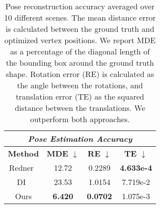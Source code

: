 \begin{table}
	\begin{center}
		\begin{tabular}{|c|c|c|c|}
			\hline
			\multicolumn{4}{|c|}{\textit{Pose Estimation Accuracy}} \\
			\hline
			\textbf{Method}                                             & \textbf{MDE}  $\downarrow$        & \textbf{RE} $\downarrow$ 		  & \textbf{TE} $\downarrow$    \\
			\hline
			Redner~\cite{li2018differentiable}							& 12.72		                            & 0.2289           	   	           & \textbf{4.633e-4}     \\
			DI~\cite{ravi2020pytorch3d} 							    & 23.53	                                &  1.0154      		                & 7.719e-2     \\
			\hline
			Ours    									   	            & \textbf{6.420}	                        & \textbf{0.0702}   	            & 1.075e-3     \\
			\hline
		\end{tabular}
	\end{center}
	\caption
	{
		Pose reconstruction accuracy averaged over 10 different scenes.
		The mean distance error is calculated between the ground truth and  optimized vertex positions. 
		We report MDE as a percentage of the diagonal length of the bounding box around the ground truth shape.
		Rotation error (RE) is calculated as the angle between the rotations, and translation error (TE) as the squared distance between the translations.
		We outperform both approaches.
	}
	\label{tab:Pose}
\end{table}
%
%
